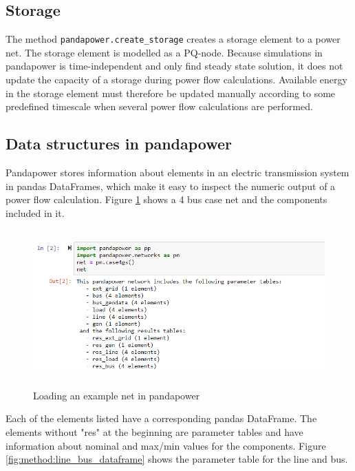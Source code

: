 \documentclass[class=book, crop=false, 11pt]{standalone}
\begin{document}
\subsection*{Storage}
The method \texttt{pandapower.create\_storage} creates a storage element to a power net. The storage element is modelled as a PQ-node. Because simulations in pandapower is time-independent and only find steady state solution, it does not update the capacity of a storage during power flow calculations. Available energy in the storage element must therefore be updated manually according to some predefined timescale when several power flow calculations are performed.  


\subsection{Data structures in pandapower}

Pandapower stores information about elements in an electric transmission system in pandas DataFrames, which make it easy to inspect the numeric output of a power flow calculation. Figure \ref{fig:method:loading_example_net} shows a 4 bus case net and the components included in it. 

\begin{figure}[H]
    \center
    \includegraphics[height=6cm, width=12cm]{figures/case4g_show_net.PNG}
    \caption {Loading an example net in pandapower}
    \label{fig:method:loading_example_net}
\end{figure}
Each of the elements listed have a corresponding pandas DataFrame. The elements without "res" at the beginning are parameter tables and have information about nominal and max/min values for the components. Figure \ref{fig:method:line_bus_dataframe} shows the parameter table for the line and bus.
\end{document}
